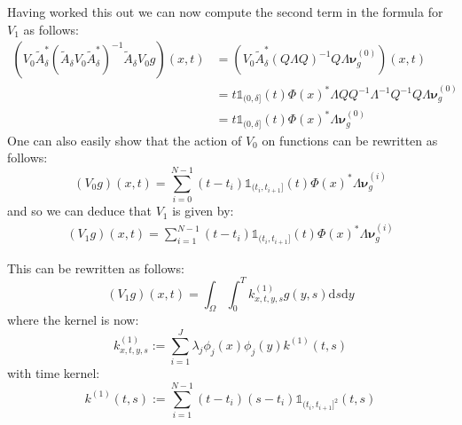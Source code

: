 \documentclass{article}
\theoremstyle{definition}
\theoremstyle{remark}
\theoremstyle{remark}
\begin{document}
\noindent Having worked this out we can now compute the second term in the formula for $V_{1}$ as follows:
\begin{align*}
    (V_{0}\tilde{A}_{\delta}^{*}(\tilde{A}_{\delta}V_{0}\tilde{A}_{\delta}^{*})^{-1}\tilde{A}_{\delta}V_{0}g)(x,t) &=
    (V_{0}\tilde{A}_{\delta}^{*}(Q\Lambda Q)^{-1}Q\Lambda\boldsymbol{\nu}_{g}^{(0)})(x,t) \\
    &=t\mathbb{1}_{(0,\delta]}(t)\Phi(x)^{*}\Lambda Q Q^{-1}\Lambda^{-1}Q^{-1}Q\Lambda\boldsymbol{\nu}_{g}^{(0)} \\
    &=t\mathbb{1}_{(0,\delta]}(t)\Phi(x)^{*}\Lambda\boldsymbol{\nu}_{g}^{(0)}
\end{align*}
One can also easily show that the action of $V_0$ on functions can be rewritten as follows:
\begin{equation}
    (V_{0}g)(x,t)=\sum_{i=0}^{N-1}(t-t_{i})\mathbb{1}_{(t_{i},t_{i+1}]}(t)\Phi(x)^{*}\Lambda\boldsymbol{\nu}_{g}^{(i)}
\end{equation}
and so we can deduce that $V_{1}$ is given by:
\begin{align*}
    (V_{1}g)(x,t) = \sum_{i=1}^{N-1}(t-t_{i})\mathbb{1}_{(t_{i},t_{i+1}]}(t)\Phi(x)^{*}\Lambda\boldsymbol{\nu}_{g}^{(i)}
\end{align*}

\noindent This can be rewritten as follows:
\begin{equation}
  (V_{1}g)(x,t)=\int_{\Omega}\int_{0}^{T}k_{x,t,y,s}^{(1)}g(y,s)\mathrm{d}s\mathrm{d}y
\end{equation}
where the kernel is now:
\begin{equation}
  k_{x,t,y,s}^{(1)}:=\sum_{i=1}^{J}\lambda_{j}\phi_{j}(x)\phi_{j}(y)k^{(1)}(t,s)
\end{equation}
with time kernel:
\begin{equation}
  k^{(1)}(t,s):=\sum_{i=1}^{N-1}(t-t_{i})(s-t_{i})\mathbb{1}_{(t_{i},t_{i+1}]^{2}}(t,s)
\end{equation}
\end{document}
